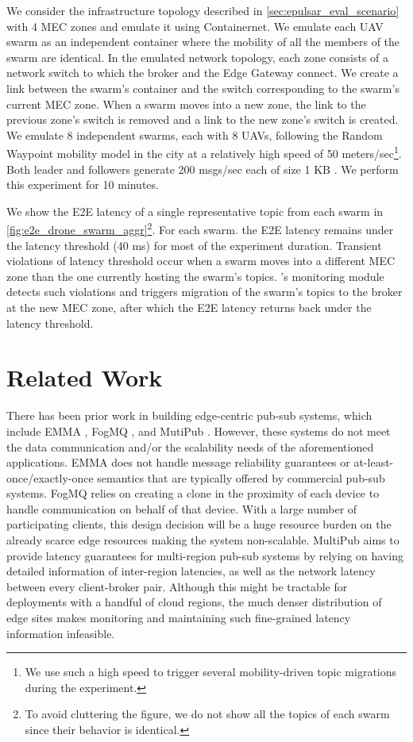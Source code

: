 We consider the infrastructure topology described in \cref{sec:epulsar_eval_scenario} with 4 MEC zones and emulate it using Containernet. We emulate each UAV swarm as an independent container where the mobility of all the members of the swarm are identical. In the emulated network topology, each zone consists of a network switch to which the broker and the Edge Gateway connect. We create a link between the swarm's container and the switch corresponding to the swarm's current MEC zone. When a swarm moves into a new zone, the link to the previous zone's switch is removed and a link to the new zone's switch is created. We emulate 8 independent swarms, each with 8 UAVs, following the Random Waypoint mobility model in the city at a relatively high speed of 50 meters/sec\footnote{We use such a high speed to trigger several mobility-driven topic migrations during the experiment.}. Both leader and followers generate 200 msgs/sec each of size 1 KB \cite{yang2018telecom}. We perform this experiment for 10 minutes.
\par We show the E2E latency of a single representative topic from each swarm in \cref{fig:e2e_drone_swarm_aggr}\footnote{To avoid cluttering the figure, we do not show all the topics of each swarm since their behavior is identical.}.
For each swarm. the E2E latency remains under the latency threshold  (40 ms) for most of the experiment duration. Transient violations of latency threshold occur when a swarm moves into a different MEC zone than the one currently hosting the swarm's topics. \epulsar{}'s monitoring module detects such violations and triggers migration of the swarm's topics to the broker at the new MEC zone, after which the E2E latency returns back under the latency threshold.

\section{Related Work}
There has been prior work in building edge-centric pub-sub systems, which include EMMA \cite{emma}, FogMQ \cite{DBLP:journals/corr/AbdelwahabH16a}, and MutiPub \cite{multipub}.  However, these systems do not meet the data communication and/or the scalability needs of the aforementioned applications.  EMMA does not handle message reliability guarantees or at-least-once/exactly-once semantics that are typically offered by commercial pub-sub systems. FogMQ relies on creating a clone in the proximity of each device to handle communication on behalf of that device. %
With a large number of participating clients, this design decision will be a huge resource burden on the already scarce edge resources making the system non-scalable.  MultiPub aims to provide latency guarantees for multi-region pub-sub systems by relying on having detailed information of inter-region latencies, as well as the network latency between every client-broker pair. Although this might be tractable for deployments with a handful of cloud regions, the much denser distribution of edge sites makes monitoring and maintaining such fine-grained latency information infeasible.

